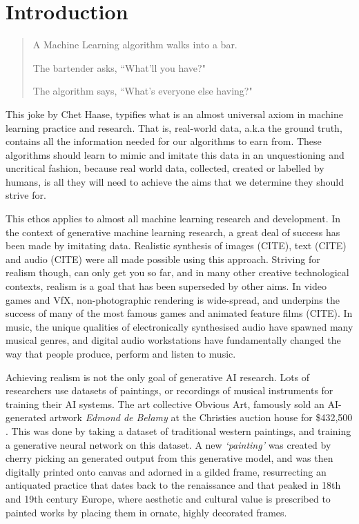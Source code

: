 \chapter{Introduction}
\label{ch:intro}

\begin{quote}A Machine Learning algorithm walks into a bar.

The bartender asks, ``What'll you have?"

The algorithm says, ``What's everyone else having?" \citep{haase2017bar} \end{quote}

This joke by Chet Haase, typifies what is an almost universal axiom in machine learning practice and research. 
That is, real-world data, a.k.a the ground truth, contains all the information needed for our algorithms to earn from. 
These algorithms should learn to mimic and imitate this data in an unquestioning and uncritical fashion, because real world data, collected, created or labelled by humans, is all they will need to achieve the aims that we determine they should strive for.

This ethos applies to almost all machine learning research and development. In the context of generative machine learning research, a great deal of success has been made by imitating data. 
Realistic synthesis of images (CITE), text (CITE) and audio (CITE) were all made possible using this approach. 
Striving for realism though, can only get you so far, and in many other creative technological contexts, realism is a goal that has been superseded by other aims. 
In video games and VfX, non-photographic rendering is wide-spread, and underpins the success of many of the most famous games and animated feature films (CITE). 
In music, the unique qualities of electronically synthesised audio have spawned many musical genres, and digital audio workstations have fundamentally changed the way that people produce, perform and listen to music.

Achieving realism is not the only goal of generative AI research. 
Lots of researchers use datasets of paintings, or recordings of musical instruments for training their AI systems. 
The art collective Obvious Art, famously sold an AI-generated artwork \textit{Edmond de Belamy} at the Christies auction house for \$432,500 \citep{christies2018edmond}.
This was done by taking a dataset of traditional western paintings, and training a generative neural network on this dataset. 
A new \textit{`painting’} was created by cherry picking an generated output from this generative model, and was then digitally printed onto canvas and adorned in a gilded frame, resurrecting an antiquated practice that dates back to the renaissance and that peaked in 18th and 19th century Europe, where aesthetic and cultural value is prescribed to painted works by placing them in ornate, highly decorated frames.

